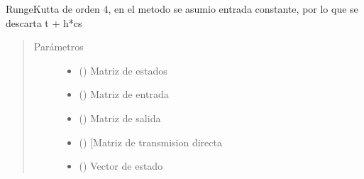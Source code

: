 \documentclass[letterpaper,10pt,spanish]{sphinxmanual}
\begin{document}
\begin{fulllineitems}
\label{\detokenize{codigos/rk_generator:rk_generator.runge_kutta4}}
Runge\sphinxhyphen{}Kutta de orden 4, en el metodo se asumio entrada constante, por lo que se descarta t + h*cs
\begin{quote}\begin{description}
\item[{Parámetros}] \leavevmode\begin{itemize}
\item {} 
 (\sphinxstyleliteralemphasis{\sphinxupquote{, }}\sphinxstyleliteralemphasis{\sphinxupquote{, }}) \textendash{} Matriz de estados

\item {} 
 (\sphinxstyleliteralemphasis{\sphinxupquote{, }}\sphinxstyleliteralemphasis{\sphinxupquote{, }}) \textendash{} Matriz de entrada

\item {} 
 (\sphinxstyleliteralemphasis{\sphinxupquote{, }}\sphinxstyleliteralemphasis{\sphinxupquote{, }}) \textendash{} Matriz de salida

\item {} 
 (\sphinxstyleliteralemphasis{\sphinxupquote{, }}\sphinxstyleliteralemphasis{\sphinxupquote{, }}) \textendash{} {[}Matriz de transmision directa

\item {} 
 (\sphinxstyleliteralemphasis{\sphinxupquote{, }}\sphinxstyleliteralemphasis{\sphinxupquote{, }}) \textendash{} Vector de estado


\end{itemize}
\end{description}
\end{quote}
\end{fulllineitems}
\end{document}
